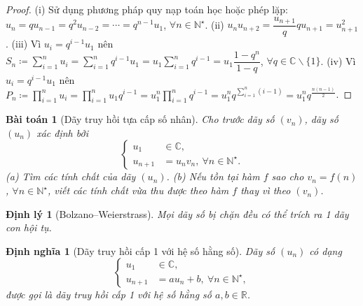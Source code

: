 \documentclass{article}
\newtheorem{baitoan}{Bài toán}
\newtheorem{dinhly}{Định lý}
\newtheorem{dinhnghia}{Định nghĩa}
\begin{document}
\begin{proof}
	(i) Sử dụng phương pháp quy nạp toán học hoặc phép lặp: $u_n = qu_{n-1} = q^2u_{n-2} = \cdots = q^{n-1}u_1$, $\forall n\in\mathbb{N}^\star$. (ii) $u_nu_{n+2} = \dfrac{u_{n+1}}{q}qu_{n+1} = u_{n+1}^2$. (iii) Vì $u_i = q^{i-1}u_1$ nên $S_n\coloneqq\sum_{i=1}^n u_i = \sum_{i=1}^n q^{i-1}u_1 = u_1\sum_{i=1}^n q^{i-1} = u_1\dfrac{1 - q^n}{1 - q}$, $\forall q\in\mathbb{C}\backslash\{1\}$. (iv) Vì $u_i = q^{i-1}u_1$ nên $P_n\coloneqq\prod_{i=1}^n u_i = \prod_{i=1}^n u_1q^{i-1} = u_1^n \prod_{i=1}^n q^{i-1} = u_1^nq^{\sum_{i=1}^n (i - 1)} = u_1^nq^{\frac{n(n - 1)}{2}}$.
\end{proof}

\begin{baitoan}[Dãy truy hồi tựa cấp số nhân]
	Cho trước dãy số $(v_n)$, dãy số $(u_n)$ xác định bởi
	\begin{equation*}
		\left\{\begin{split}
			u_1&\in\mathbb{C},\\
			u_{n+1} &= u_nv_n,\ \forall n\in\mathbb{N}^\star.
		\end{split}\right.
	\end{equation*}
	(a) Tìm các tính chất của dãy $(u_n)$. (b) Nếu tồn tại hàm $f$ sao cho $v_n = f(n)$, $\forall n\in\mathbb{N}^\star$, viết các tính chất vừa thu được theo hàm $f$ thay vì theo $(v_n)$.
\end{baitoan}

\begin{dinhly}[Bolzano--Weierstrass]
	Mọi dãy số bị chặn đều có thể trích ra 1 dãy con hội tụ.
\end{dinhly}

\begin{dinhnghia}[Dãy truy hồi cấp 1 với hệ số hằng số]
	Dãy số $(u_n)$ có dạng
	\begin{equation}
		\label{day truy hoi cap 1 voi he so hang so}
		\left\{\begin{split}
			u_1&\in\mathbb{C},\\
			u_{n+1} &= au_n + b,\ \forall n\in\mathbb{N}^\star,
		\end{split}\right.
	\end{equation}
	được gọi là {\rm dãy truy hồi cấp 1 với hệ số hằng số} $a,b\in\mathbb{R}$.
\end{dinhnghia}
\end{document}

